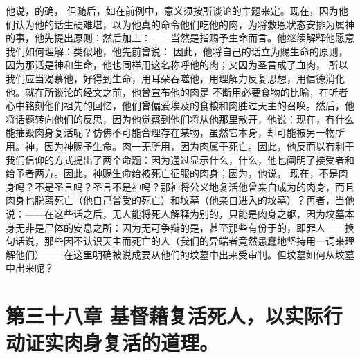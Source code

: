 他说，的确， 但随后，如在前例中，意义须按所谈论的主题来定。现在，因为他们认为他的话生硬难堪，以为他真的命令他们吃他的肉，为将救恩状态安排为属神的事，他先提出原则：然后加上：——当然是指赐予生命而言。他继续解释他愿意我们如何理解：类似地，他先前曾说： 因此，他将自己的话立为赐生命的原则，因为那话是神和生命，他也同样用这名称呼他的肉；又因为圣言成了血肉， 所以我们应当渴慕他，好得到生命，用耳朵吞噬他，用理解力反复思想，用信德消化他。就在所谈论的经文之前，他曾宣布他的肉是 不断用必要食物的比喻，在听者心中铭刻他们祖先的回忆，他们曾偏爱埃及的食粮和肉胜过天主的召唤。然后，他将话题转向他们的反思，因为他觉察到他们将从他那里散开，他说：现在，有什么能摧毁肉身复活呢？仿佛不可能合理存在某物，虽然它本身，却可能被另一物所用。神，因为神赐予生命。肉一无所用，因为肉属于死亡。因此，他反而以有利于我们信仰的方式提出了两个命题：因为通过显示什么，什么，他也阐明了接受者和给予者两方。因此，神赐生命给被死亡征服的肉身；因为，他说， 现在，不是肉身吗？不是圣言吗？圣言不是神吗？那神将公义地复活他曾亲自成为的肉身，而且肉身也脱离死亡（他自己曾受的死亡）和坟墓（他亲自进入的坟墓）？再者，当他说：——在这些话之后，无人能将死人解释为别的，只能是肉身之躯，因为坟墓本身无非是尸体的安息之所：因为无可争辩的是，甚至那些有份于的，即罪人——换句话说，那些因不认识天主而死亡的人（我们的异端者竟然愚蠢地坚持用一词来理解他们）——在这里明确被说成要从他们的坟墓中出来受审判。但坟墓如何从坟墓中出来呢？\par


\section{第三十八章 基督藉复活死人，以实际行动证实肉身复活的道理。}

